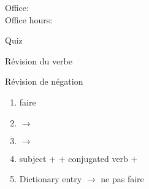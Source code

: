 \documentclass{beamer}
\subtitle[Nos loisirs (encore)]{Nos loisirs (encore)}
\begin{document}
  \begin{frame}
    \titlepage
    \tiny{Office: \\
          Office hours: }
  \end{frame}

  \begin{frame}{}
    \begin{center}
      \Large Quiz
    \end{center}
  \end{frame}

  \begin{frame}{Révision du verbe }
    \begin{center}
      
    \end{center}
  \end{frame}

  \begin{frame}{Révision de négation}
    \begin{enumerate}
      \item faire 
      \item<2->  $\to$ \underline{}
      \item<4->  $\to$ \underline{}
      \item<6-> subject +  + conjugated verb + 
      \item<7-> Dictionary entry $\to$ ne pas faire
    \end{enumerate}
  \end{frame}
\end{document}
